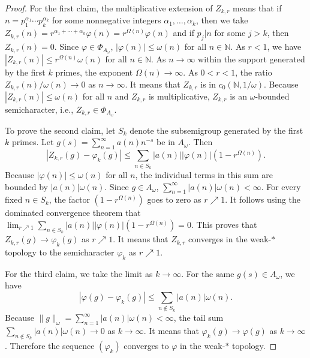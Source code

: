 \documentclass[10pt,a4paper]{amsart}
\begin{document}
\begin{proof}
For the first claim, the multiplicative extension of $Z_{k,r}$ means that if $n=p_1^{\alpha_1}\cdots p_k^{\alpha_k}$ for some nonnegative integers $\alpha_1, \ldots, \alpha_k$, then we take $Z_{k,r}(n) = r^{\alpha_1+\cdots+\alpha_k}\varphi(n) = r^{\Omega(n)}\varphi(n)$ and if $p_j|n$ for some $j>k$, then $Z_{k,r}(n)=0$. Since $\varphi \in \Phi_{A_\omega}$, $|\varphi(n)| \leq \omega(n)$ for all $n\in \mathbb N$. As $r < 1$, we have $|Z_{k,r}(n)| \leq r^{\Omega(n)} \omega(n)$ for all $n \in \mathbb N$. As $n \to \infty$ within the support generated by the first $k$ primes, the exponent $\Omega(n) \to \infty$. As $0<r<1$, the ratio $Z_{k,r}(n) / \omega(n)\to 0$ as $n\to \infty$. It means that $Z_{k,r}$ is in $c_0(\mathbb N, 1/\omega)$. Because $|Z_{k,r}(n)| \leq \omega(n)$ for all $n$ and $Z_{k,r}$ is multiplicative, $Z_{k,r}$ is an $\omega$-bounded semicharacter, i.e., $Z_{k,r}\in \Phi_{A_\omega}$.

To prove the second claim, let $S_k$ denote the subsemigroup generated by the first $k$ primes. Let $g(s) = \sum_{n=1}^\infty a(n) n^{-s}$ be in $A_\omega$. Then
$$|Z_{k,r}(g) - \varphi_k(g)| \leq \sum_{n \in S_k} |a(n)| |\varphi(n)| (1 - r^{\Omega(n)}).$$
Because $|\varphi(n)| \leq \omega(n)$ for all $n$, the individual terms in this sum are bounded by $|a(n)| \omega(n)$. Since $g \in A_\omega$, $\sum_{n=1}^\infty |a(n)| \omega(n)<\infty$. For every fixed $n \in S_k$, the factor $(1 - r^{\Omega(n)})$ goes to zero as $r \nearrow 1$. It follows using the dominated convergence theorem that $\lim_{r\nearrow 1}\sum_{n \in S_k} |a(n)| |\varphi(n)| (1 - r^{\Omega(n)})=0$. This proves that $Z_{k,r}(g) \to \varphi_k(g)$ as $r\nearrow 1$. It means that $Z_{k,r}$ converges in the weak-$\ast$ topology to the semicharacter $\varphi_k$ as $r\nearrow 1$.

For the third claim, we take the limit as $k \to \infty$. For the same $g(s) \in A_\omega$, we have
$$|\varphi(g) - \varphi_k(g)| \leq \sum_{n \notin S_k} |a(n)| \omega(n).$$
Because $\|g\|_\omega=\sum_{n=1}^\infty|a(n)|\omega(n)<\infty$, the tail sum $\sum_{n \notin S_k} |a(n)| \omega(n) \to 0$ as $k \to \infty$. It means that $\varphi_k(g) \to \varphi(g)$ as $k\to \infty$. Therefore the sequence $(\varphi_k)$ converges to $\varphi$ in the weak-$\ast$ topology.
\end{proof}
\end{document}
